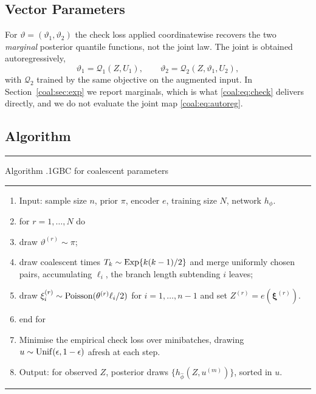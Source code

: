 \subsection{Vector Parameters}\label{coal:sec:vector}

For $\vartheta=(\vartheta_1,\vartheta_2)$ the check loss applied coordinatewise recovers the two \emph{marginal} posterior quantile functions, not the joint law. The joint is obtained autoregressively,
\begin{equation}\label{coal:eq:autoreg}
\vartheta_1=\mathcal{Q}_1(Z,U_1),\qquad\vartheta_2=\mathcal{Q}_2(Z,\vartheta_1,U_2),
\end{equation}
with $\mathcal{Q}_2$ trained by the same objective on the augmented input. In Section~\ref{coal:sec:exp} we report marginals, which is what \eqref{coal:eq:check} delivers directly, and we do not evaluate the joint map \eqref{coal:eq:autoreg}.

\subsection{Algorithm}\label{coal:sec:algorithm}

\begin{center}
\begin{minipage}{\textwidth}
\hrule\smallskip
Algorithm \thechapter.1\quad GBC for coalescent parameters
\smallskip\hrule
\begin{enumerate}[label={\footnotesize\arabic*:},leftmargin=2em,itemsep=1pt,topsep=3pt]
\item Input: sample size $n$, prior $\pi$, encoder $e$, training size $N$, network $h_\phi$.
\item for $r=1,\dots,N$ do
\item \quad draw $\vartheta^{(r)}\sim\pi$;
\item \quad draw coalescent times $T_k\sim\mathrm{Exp}\{k(k-1)/2\}$ and merge uniformly chosen pairs, accumulating $\ell_i$, the branch length subtending $i$ leaves;
\item \quad draw $\xi_i^{(r)}\sim\mathrm{Poisson}(\theta^{(r)} \ell_i/2)$ for $i=1,\dots,n-1$ and set $Z^{(r)}=e(\bm{\xi}^{(r)})$.
\item end for
\item Minimise the empirical check loss over minibatches, drawing $u\sim\mathrm{Unif}(\epsilon,1-\epsilon)$ afresh at each step.
\item Output: for observed $Z$, posterior draws $\{h_{\hat\phi}(Z,u^{(m)})\}$, sorted in $u$.
\end{enumerate}
\hrule
\end{minipage}
\end{center}

